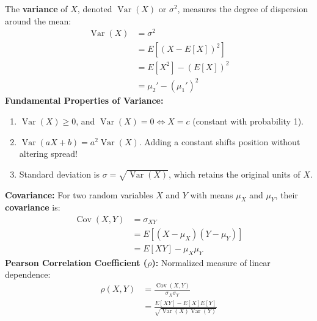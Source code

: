 \documentclass[12pt,a4paper]{article}
\begin{document}
\begin{tcolorbox}[formulabox, title={\textbf{Variance and Standard Deviation}}]
The \textbf{variance} of $X$, denoted $\operatorname{Var}(X)$ or $\sigma^2$, measures the degree of dispersion around the mean:
\begin{equation}
  \begin{aligned}
    \operatorname{Var}(X) &= \sigma^2 \\[3pt]
    &= E\left[(X - E[X])^2\right] \\[3pt]
    &= E[X^2] - (E[X])^2 \\[3pt]
    &= \mu_2' - (\mu_1')^2
  \end{aligned}
\end{equation}
\textbf{Fundamental Properties of Variance:}
\begin{enumerate}[leftmargin=*, itemsep=2pt]
  \item $\operatorname{Var}(X) \ge 0$, and $\operatorname{Var}(X) = 0 \iff X = c$ (constant with probability 1).
  \item $\operatorname{Var}(aX + b) = a^2 \operatorname{Var}(X)$. Adding a constant shifts position without altering spread!
  \item Standard deviation is $\sigma = \sqrt{\operatorname{Var}(X)}$, which retains the original units of $X$.
\end{enumerate}
\end{tcolorbox}

\begin{tcolorbox}[defbox, title={\textbf{Definition: Covariance and Correlation Coefficient}}]
\textbf{Covariance:} For two random variables $X$ and $Y$ with means $\mu_X$ and $\mu_Y$, their \textbf{covariance} is:
\begin{equation}
  \begin{aligned}
    \operatorname{Cov}(X, Y) &= \sigma_{XY} \\[3pt]
    &= E[(X - \mu_X)(Y - \mu_Y)] \\[3pt]
    &= E[XY] - \mu_X \mu_Y
  \end{aligned}
\end{equation}
\textbf{Pearson Correlation Coefficient ($\rho$):} Normalized measure of linear dependence:
\begin{equation}
  \begin{aligned}
    \rho(X, Y) &= \frac{\operatorname{Cov}(X, Y)}{\sigma_X \sigma_Y} \\[3pt]
    &= \frac{E[XY] - E[X]E[Y]}{\sqrt{\operatorname{Var}(X)\operatorname{Var}(Y)}}
  \end{aligned}
\end{equation}
\end{tcolorbox}
\end{document}
